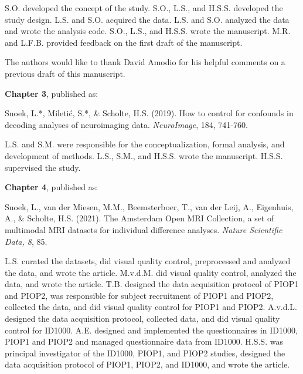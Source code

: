 \documentclass[12pt,american,a4paper,oneside,]{memoir} %
\begin{document}
\vspace{2mm}

S.O. developed the concept of the study. S.O., L.S., and H.S.S. developed the study design. L.S. and S.O. acquired the data. L.S. and S.O. analyzed the data and wrote the analysis code. S.O., L.S., and H.S.S. wrote the manuscript. M.R. and L.F.B. provided feedback on the first draft of the manuscript.

\vspace{2mm}

The authors would like to thank David Amodio for his helpful comments on a previous draft of this manuscript.

\vspace{3mm}

\textbf{Chapter 3}, published as:

\vspace{2mm}

Snoek, L.*, Miletić, S.*, \& Scholte, H.S. (2019). How to control for confounds in decoding analyses of neuroimaging data. \emph{NeuroImage}, 184, 741-760.

\vspace{2mm}

L.S. and S.M. were responsible for the conceptualization, formal analysis, and development of methods. L.S., S.M., and H.S.S. wrote the manuscript. H.S.S. supervised the study.

\vspace{3mm}

\textbf{Chapter 4}, published as:

\vspace{2mm}

Snoek, L., van der Miesen, M.M., Beemsterboer, T., van der Leij, A., Eigenhuis, A., \& Scholte, H.S. (2021). The Amsterdam Open MRI Collection, a set of multimodal MRI datasets for individual difference analyses. \emph{Nature Scientific Data, 8}, 85.

\vspace{2mm}

L.S. curated the datasets, did visual quality control, preprocessed and analyzed the data, and wrote the article. M.v.d.M. did visual quality control, analyzed the data, and wrote the article. T.B. designed the data acquisition protocol of PIOP1 and PIOP2, was responsible for subject recruitment of PIOP1 and PIOP2, collected the data, and did visual quality control for PIOP1 and PIOP2. A.v.d.L. designed the data acquisition protocol, collected data, and did visual quality control for ID1000. A.E. designed and implemented the questionnaires in ID1000, PIOP1 and PIOP2 and managed questionnaire data from ID1000. H.S.S. was principal investigator of the ID1000, PIOP1, and PIOP2 studies, designed the data acquisition protocol of PIOP1, PIOP2, and ID1000, and wrote the article.
\end{document}
